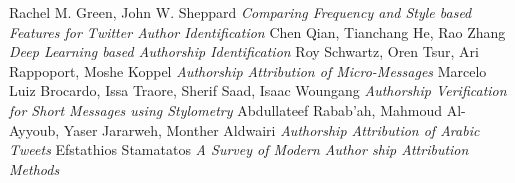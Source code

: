 \documentclass[a4paper]{article}
\begin{document}
\begin{thebibliography}{9}

	Rachel M. Green, John W. Sheppard
	\textit{Comparing Frequency and Style based Features for Twitter Author Identification}
	Chen Qian, Tianchang He, Rao Zhang
	\textit{Deep Learning based Authorship Identification}
	Roy Schwartz, Oren Tsur, Ari Rappoport, Moshe Koppel
	\textit{Authorship Attribution of Micro-Messages}
	Marcelo Luiz Brocardo, Issa Traore, Sherif Saad, Isaac Woungang
	\textit{Authorship Verification for Short Messages using Stylometry}
	Abdullateef Rabab’ah, Mahmoud Al-Ayyoub, Yaser Jararweh, Monther Aldwairi
	\textit{Authorship Attribution of Arabic Tweets}
	Efstathios Stamatatos
	\textit{A Survey of Modern Author ship Attribution Methods}
	
\end{thebibliography}
\end{document}
